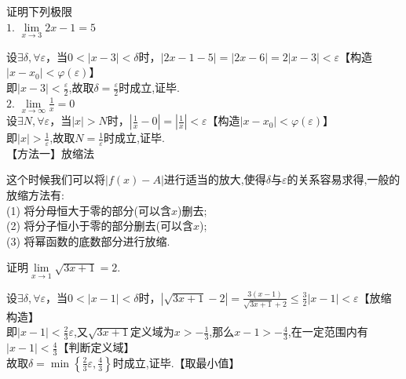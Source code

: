 \examples 证明下列极限\\[0.5em]
\hspace*{0.8em} $1.\,\,\lim\limits_{x \to 3}2x-1=5$

\proof  设$\exists \delta,\forall \varepsilon$，当$0<|x-3|<\delta $时，$|2x-1-5|=|2x-6|=2|x-3|<\varepsilon$\quad \quad 【构造$|x-x_0 | < \varphi (\varepsilon)$】\\[0.5em]
即$\displaystyle |x-3|<\frac{\varepsilon}{2}$,故取$\displaystyle \delta = \frac{\varepsilon}{2}$时成立,证毕.\\[1.5em]
\hspace*{0.8em} $2.\,\,\displaystyle \lim\limits_{x \to \infty }\frac{1}{x}=0$\\[1em]
\proof  设$\exists N,\forall \varepsilon$，当$|x|>N$时，$\displaystyle \left| \frac{1}{x}-0\right| =\left| \frac{1}{x}\right|<\varepsilon$\hspace{13em}【构造$|x-x_0 | < \varphi (\varepsilon)$】\\[0.5em]
即$\displaystyle |x|>\frac{1}{\varepsilon}$,故取$\displaystyle N = \frac{1}{\varepsilon}$时成立,证毕.\\

\noindent 【方法一】放缩法\vspace{0.3em}
\par 这个时候我们可以将$|f (x) - A|$进行适当的放大,使得$\delta $与$\varepsilon$的关系容易求得,一般的放缩方法有:\\[0.5em]
\noindent (1) 将分母恒大于零的部分(可以含$x$)删去;\\[0.5em]
\noindent (2) 将分子恒小于零的部分删去(可以含$x$);\\[0.5em]
\noindent (3) 将幂函数的底数部分进行放缩.

\examples 证明$\displaystyle \lim\limits_{x \to 1}\sqrt{3x+1}=2.$

\proof 设$\exists \delta,\forall \varepsilon$，当$0<|x-1|<\delta $时，$\displaystyle |\sqrt{3x+1}-2|=\frac{3(x-1)}{\sqrt{3x+1}+2}\le \frac{3}{2}|x-1|<\varepsilon$\hspace{4em}【放缩构造】\\[0.5em]
即$\displaystyle |x-1|<\frac{2}{3}\varepsilon$,又$\displaystyle \sqrt{3x+1}$定义域为$\displaystyle x>-\frac{1}{3}$,那么$\displaystyle x-1>-\frac{4}{3}$,在一定范围内有$\displaystyle |x-1|<\frac{4}{3}$\hspace{1em}【判断定义域】\\[0.5em]
故取$\displaystyle \delta = \min \left\lbrace  \frac{2}{3}\varepsilon,\frac{4}{3} \right\rbrace $时成立,证毕.\hspace{27em}【取最小值】\\

